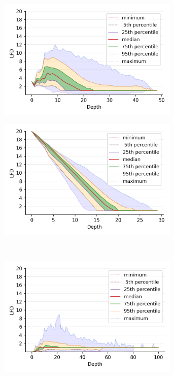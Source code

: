 \begin{figure}
\begin{subfigure}[b]{0.47\textwidth}
        \includegraphics[width=0.95\textwidth]{images/lfd/sift.png}\\
        \label{fig:results:sift-lfd}
    \end{subfigure}%
    \begin{subfigure}[b]{0.47\textwidth}
        \includegraphics[width=0.95\textwidth]{images/lfd/random.png}\\
        \label{fig:results:random-lfd}
    \end{subfigure}
    \\
    \begin{subfigure}[b]{0.47\textwidth}
        \includegraphics[width=0.95\textwidth]{images/lfd/silva-SSU-Ref.png}\\

\end{subfigure}
\end{figure}
